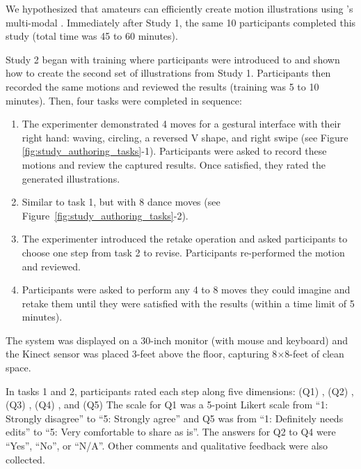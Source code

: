 We hypothesized that amateurs can efficiently create motion illustrations using \systemname{}'s multi-modal \phaseI{}.
%
Immediately after Study 1, the same 10 participants completed this study (total time was 45 to 60 minutes).

%
Study 2 began with training where participants were introduced to \systemname{} and shown how to create the second set of illustrations from Study 1.
Participants then recorded the same motions and reviewed the results (training was 5 to 10 minutes).
%
Then, four tasks were completed in sequence:
\begin{enumerate}
  \item The experimenter demonstrated 4 moves for a gestural interface with their right hand: waving, circling, a reversed V shape, and right swipe (see Figure \ref{fig:study_authoring_tasks}-1). Participants were asked to record these motions and review the captured results. Once satisfied, they rated the generated illustrations.
  \item Similar to task 1, but with 8 dance moves (see Figure~\ref{fig:study_authoring_tasks}-2).
  \item The experimenter introduced the retake operation and asked participants to choose one step from task 2 to revise. Participants re-performed the motion and reviewed.
  \item Participants were asked to perform any 4 to 8 moves they could imagine and retake them until they were satisfied with the results (within a time limit of 5 minutes).
\end{enumerate}
%
The system was displayed on a 30-inch monitor (with mouse and keyboard) and the Kinect sensor was placed 3-feet above the floor, capturing 8$\times$8-feet of clean space.

%
In tasks 1 and 2, participants rated each step along five dimensions: (Q1) , (Q2) , (Q3) , (Q4) , and (Q5) 
%
The scale for Q1 was a 5-point Likert scale from ``1: Strongly disagree'' to ``5: Strongly agree'' and Q5 was from ``1: Definitely needs edits'' to ``5: Very comfortable to share as is''. The answers for Q2 to Q4 were ``Yes'', ``No'', or ``N/A''.
%
%
Other comments and qualitative feedback were also collected.

